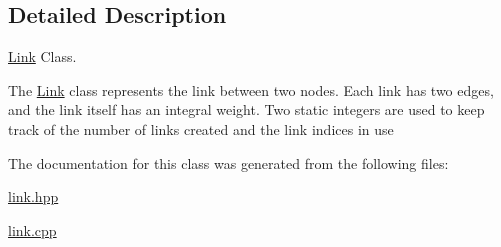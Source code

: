 \subsection{Detailed Description}
\hyperlink{classLink}{Link} Class. 

The \hyperlink{classLink}{Link} class represents the link between two nodes. Each link has two edges, and the link itself has an integral weight. Two static integers are used to keep track of the number of links created and the link indices in use 

The documentation for this class was generated from the following files\-:\begin{DoxyCompactItemize}
\item 
\hyperlink{link_8hpp}{link.\-hpp}\item 
\hyperlink{link_8cpp}{link.\-cpp}\end{DoxyCompactItemize}
